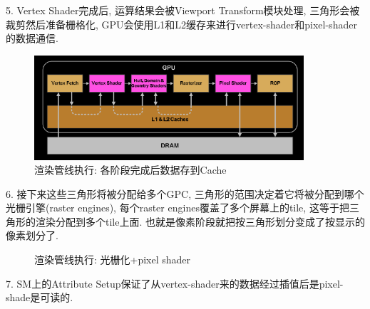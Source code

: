\documentclass[UTF8]{ctexart}
\begin{document}
5. Vertex Shader完成后, 运算结果会被Viewport Transform模块处理, 三角形会被裁剪然后准备栅格化, GPU会使用L1和L2缓存来进行vertex-shader和pixel-shader的数据通信.
\begin{figure}[H]
  \includegraphics[width=10cm]{rendering_logic_2}
  \centering
  \caption{渲染管线执行: 各阶段完成后数据存到Cache}
  \label{fig:rendering_pipeline_stage_res}
\end{figure}

6. 接下来这些三角形将被分配给多个GPC, 三角形的范围决定着它将被分配到哪个光栅引擎(raster engines), 每个raster engines覆盖了多个屏幕上的tile, 这等于把三角形的渲染分配到多个tile上面. 也就是像素阶段就把按三角形划分变成了按显示的像素划分了.
\begin{figure}[H]
  \centering
  \caption{渲染管线执行: 光栅化+pixel shader}
  \label{fig: rendering_rastering}
\end{figure}

7. SM上的Attribute Setup保证了从vertex-shader来的数据经过插值后是pixel-shade是可读的. 
\end{document}
